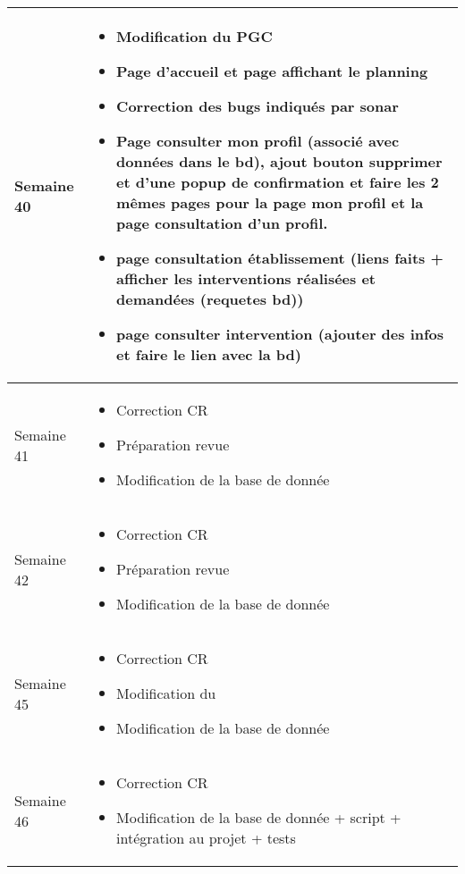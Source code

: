 \documentclass [a4paper] {article}
\begin{document}
\begin{longtable}{|>{\columncolor{gray!40}}p{2cm}|p{12cm}|}
	Semaine 40 & \begin{itemize}
	\item Modification du PGC
	\item Page d'accueil et page affichant le planning
	\item Correction des bugs indiqués par sonar
	\item Page consulter mon profil (associé avec données dans le bd), ajout bouton supprimer et d'une popup de confirmation et faire les 2 mêmes pages pour la page mon profil et la page consultation d'un profil. 
	\item page consultation établissement (liens faits + afficher les interventions réalisées et demandées (requetes bd))
	\item page consulter intervention (ajouter des infos et faire le lien avec la bd)
	\end{itemize} \\
	\hline
	
	Semaine 41 & \begin{itemize}
	\item Correction CR
	\item Préparation revue 
	\item Modification de la base de donnée
	\end{itemize} \\
	\hline

	Semaine 42 & \begin{itemize}
	\item Correction CR
	\item Préparation revue 
	\item Modification de la base de donnée
	\end{itemize} \\
	\hline

	Semaine 45 & \begin{itemize}
	\item Correction CR
	\item Modification du \PGC
	\item Modification de la base de donnée
	\end{itemize} \\
	\hline

	Semaine 46 & \begin{itemize}
	\item Correction CR
	\item Modification de la base de donnée + script + intégration au projet + tests
	\end{itemize} \\
	\hline


\end{longtable}
\end{document}
